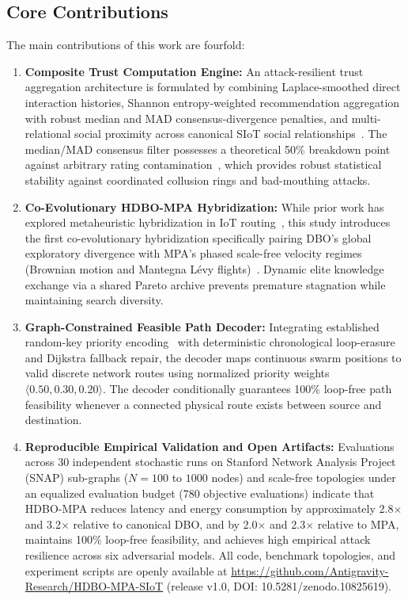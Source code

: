 \documentclass[journal,compsoc]{IEEEtran}
\begin{document}
\subsection{Core Contributions}
The main contributions of this work are fourfold:
\begin{enumerate}
    \item \textbf{Composite Trust Computation Engine:} An attack-resilient trust aggregation architecture is formulated by combining Laplace-smoothed direct interaction histories, Shannon entropy-weighted recommendation aggregation with robust median and MAD consensus-divergence penalties, and multi-relational social proximity across canonical SIoT social relationships~\cite{rad2020social, chahal2020secure}. The median/MAD consensus filter possesses a theoretical 50\% breakdown point against arbitrary rating contamination~\cite{rousseeuw2020statistical, ahangaran2024dreamer}, which provides robust statistical stability against coordinated collusion rings and bad-mouthing attacks.
    \item \textbf{Co-Evolutionary HDBO-MPA Hybridization:} While prior work has explored metaheuristic hybridization in IoT routing~\cite{kumar2023marine}, this study introduces the first co-evolutionary hybridization specifically pairing DBO's global exploratory divergence with MPA's phased scale-free velocity regimes (Brownian motion and Mantegna L\'evy flights)~\cite{xue2022dung, faramarzi2020marine}. Dynamic elite knowledge exchange via a shared Pareto archive prevents premature stagnation while maintaining search diversity.
    \item \textbf{Graph-Constrained Feasible Path Decoder:} Integrating established random-key priority encoding~\cite{chaves2024biased} with deterministic chronological loop-erasure~\cite{jarai2020toppling} and Dijkstra fallback repair, the decoder maps continuous swarm positions to valid discrete network routes using normalized priority weights $\langle 0.50, 0.30, 0.20 \rangle$. The decoder conditionally guarantees 100\% loop-free path feasibility whenever a connected physical route exists between source and destination.
    \item \textbf{Reproducible Empirical Validation and Open Artifacts:} Evaluations across 30 independent stochastic runs on Stanford Network Analysis Project (SNAP) sub-graphs ($N = 100$ to $1000$ nodes) and scale-free topologies under an equalized evaluation budget (780 objective evaluations) indicate that HDBO-MPA reduces latency and energy consumption by approximately 2.8$\times$ and 3.2$\times$ relative to canonical DBO, and by 2.0$\times$ and 2.3$\times$ relative to MPA, maintains 100\% loop-free feasibility, and achieves high empirical attack resilience across six adversarial models. All code, benchmark topologies, and experiment scripts are openly available at \url{https://github.com/Antigravity-Research/HDBO-MPA-SIoT} (release v1.0, DOI: 10.5281/zenodo.10825619).
\end{enumerate}
\end{document}
